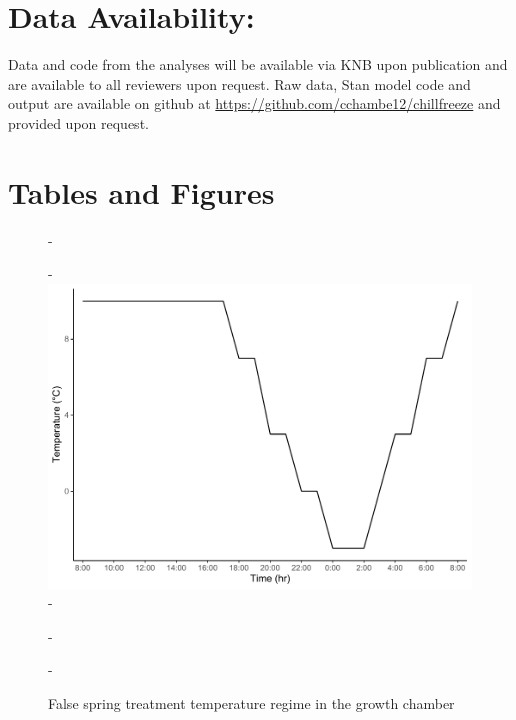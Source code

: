 \documentclass{article}\usepackage[]{graphicx}\usepackage[]{color}
\begin{document}
\section*{Data Availability:}
Data and code from the analyses will be available via KNB upon publication and are available to all reviewers upon request. Raw data, {Stan} model code and output are available on github at \url{https://github.com/cchambe12/chillfreeze} and provided upon request.




\section*{Tables and Figures}

{\begin{figure} [H]
  -\begin{center}
  -\includegraphics[width=12cm]{..//analyses/figures/growthchamber.pdf}
  -\caption{False spring treatment temperature regime in the growth chamber}\label{fig:gccond}
  -\end{center}
  -\end{figure}}
  
\end{document}
